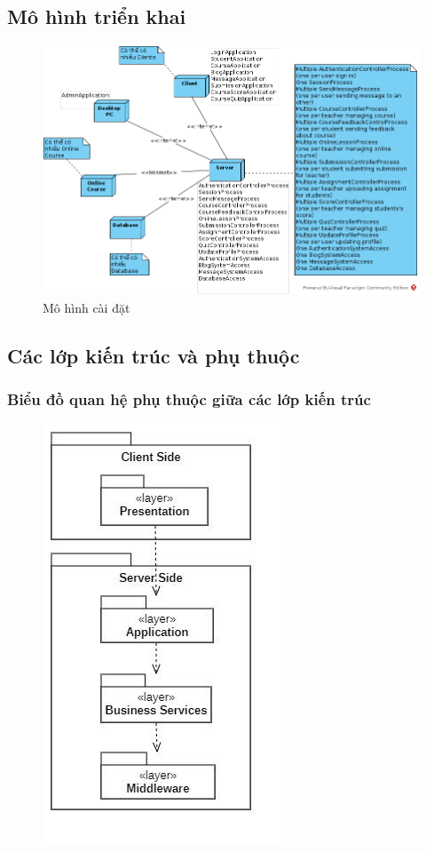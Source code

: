 \documentclass[./../main_file.tex]{subfiles}
\begin{document}
	
\subsection{Mô hình triển khai}

\begin{figure}[H]
	\centering
	\includegraphics[width=\linewidth]{./images/deployment_model.png}
	\caption{Mô hình cài đặt}
\end{figure}

\subsection{Các lớp kiến trúc và phụ thuộc}

\subsubsection{Biểu đồ quan hệ phụ thuộc giữa các lớp kiến trúc}

\begin{figure}[H]
	\centering
	\includegraphics[width=0.5\linewidth]{./images/lop_kien_truc.jpg}
\end{figure}
\end{document}
